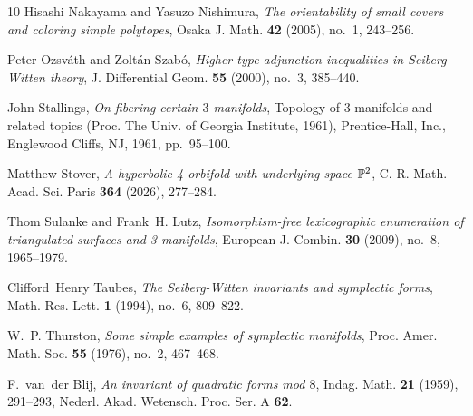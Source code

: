 \documentclass{amsart}
\numberwithin{equation}{section}
\theoremstyle{definition}
\theoremstyle{remark}
\begin{document}
\begin{thebibliography}{10}
Hisashi Nakayama and Yasuzo Nishimura, \emph{The orientability of small covers
  and coloring simple polytopes}, Osaka J. Math. \textbf{42} (2005), no.~1,
  243--256. 

Peter Ozsv\'ath and Zolt\'an Szab\'o, \emph{Higher type adjunction inequalities
  in {S}eiberg-{W}itten theory}, J. Differential Geom. \textbf{55} (2000),
  no.~3, 385--440. 

John Stallings, \emph{On fibering certain {$3$}-manifolds}, Topology of
  3-manifolds and related topics ({P}roc. {T}he {U}niv. of {G}eorgia
  {I}nstitute, 1961), Prentice-Hall, Inc., Englewood Cliffs, NJ, 1961,
  pp.~95--100. 

Matthew Stover, \emph{A hyperbolic 4-orbifold with underlying space {$\Bbb
  P^2$}}, C. R. Math. Acad. Sci. Paris \textbf{364} (2026), 277--284.

Thom Sulanke and Frank~H. Lutz, \emph{Isomorphism-free lexicographic
  enumeration of triangulated surfaces and 3-manifolds}, European J. Combin.
  \textbf{30} (2009), no.~8, 1965--1979. 

Clifford~Henry Taubes, \emph{The {S}eiberg-{W}itten invariants and symplectic
  forms}, Math. Res. Lett. \textbf{1} (1994), no.~6, 809--822. 

W.~P. Thurston, \emph{Some simple examples of symplectic manifolds}, Proc.
  Amer. Math. Soc. \textbf{55} (1976), no.~2, 467--468. 

F.~van~der Blij, \emph{An invariant of quadratic forms mod {$8$}}, Indag. Math.
  \textbf{21} (1959), 291--293, Nederl. Akad. Wetensch. Proc. Ser. A {\bf 62}.
\end{thebibliography}
\end{document}
